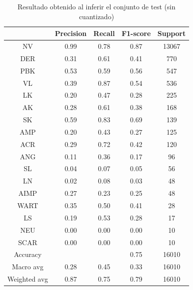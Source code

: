 \begin{table}[!ht]
	\centering
	\begin{tabular}{|c|c|c|c|c|}
		\hline
		~ & Precision & Recall & F1-score & Support \\ \hline
		NV & 0.99 & 0.78 & 0.87 & 13067 \\ \hline
		DER & 0.31 & 0.61 & 0.41 & 770 \\ \hline
		PBK & 0.53 & 0.59 & 0.56 & 547 \\ \hline
		VL & 0.39 & 0.87 & 0.54 & 536 \\ \hline
		LK & 0.20 & 0.47 & 0.28 & 225 \\ \hline
		AK & 0.28 & 0.61 & 0.38 & 168 \\ \hline
		SK & 0.59 & 0.83 & 0.69 & 139 \\ \hline
		AMP & 0.20 & 0.43 & 0.27 & 125 \\ \hline
		ACR & 0.29 & 0.72 & 0.42 & 120 \\ \hline
		ANG & 0.11 & 0.36 & 0.17 & 96 \\ \hline
		SL & 0.04 & 0.07 & 0.05 & 56 \\ \hline
		LN & 0.02 & 0.08 & 0.03 & 48 \\ \hline
		AIMP & 0.27 & 0.23 & 0.25 & 48 \\ \hline
		WART & 0.35 & 0.50 & 0.41 & 28 \\ \hline
		LS & 0.19 & 0.53 & 0.28 & 17 \\ \hline
		NEU & 0.00 & 0.00 & 0.00 & 10 \\ \hline
		SCAR & 0.00 & 0.00 & 0.00 & 10 \\ \hline
		Accuracy & ~ & ~ & 0.75 & 16010 \\ \hline
		Macro avg & 0.28 & 0.45 & 0.33 & 16010 \\ \hline
		Weighted avg & 0.87 & 0.75 & 0.79 & 16010 \\ \hline
	\end{tabular}
	\caption{Resultado obtenido al inferir el conjunto de test (sin cuantizado)}
	\label{tab:testbenorig}
\end{table}

